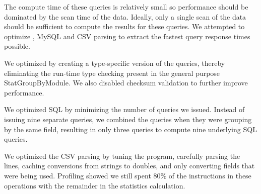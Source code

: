 The compute time of these queries is relatively small so performance
should be dominated by the scan time of the data.  Ideally, only a
single scan of the data should be sufficient to compute the results
for these queries.  We attempted to optimize \DataSeries{}, MySQL and CSV
parsing to extract the fastest query response times possible.  


We optimized \DataSeries{} by creating a type-specific version of the
queries, thereby eliminating the run-time type checking present
in the general purpose \DS{}StatGroupByModule.  We also disabled checksum validation to further improve performance.

We optimized SQL by minimizing the number of queries we issued. Instead of
issuing nine separate queries, we combined the queries when they were 
grouping by the same field, resulting in only three queries to compute
nine underlying SQL queries.


We optimized the CSV parsing by tuning the program, carefully parsing
the lines, caching conversions from strings to doubles, and only
converting fields that were being used.  Profiling showed we still spent 80\% of the
instructions in these operations with the remainder in the statistics
calculation.

